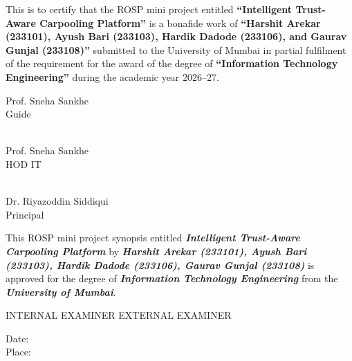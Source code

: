 \documentclass[12pt,a4paper,oneside]{report}
\newcommand{\frontheading}[1]{%
  \begin{center}\vspace*{0.2cm}{\Large\bfseries #1}\end{center}\vspace{0.8cm}}
\begin{document}
\clearpage
\frontheading{CERTIFICATE}
\justifying
This is to certify that the ROSP mini project entitled \textbf{``Intelligent
Trust-Aware Carpooling Platform''} is a bonafide work of \textbf{``Harshit Arekar
(233101), Ayush Bari (233103), Hardik Dadode (233106), and Gaurav Gunjal
(233108)''} submitted to the University of Mumbai in partial fulfilment of the
requirement for the award of the degree of \textbf{``Information Technology
Engineering''} during the academic year 2026--27.

\vspace{3cm}
\begin{center}
Prof. Sneha Sankhe\\Guide
\end{center}
\vspace{1.0cm}
\noindent
\begin{minipage}[t]{0.45\textwidth}\centering
\\
Prof. Sneha Sankhe\\HOD IT
\end{minipage}\hfill
\begin{minipage}[t]{0.45\textwidth}\centering
\\
Dr. Riyazoddin Siddiqui\\Principal
\end{minipage}
\vspace{1.2cm}

\clearpage
\frontheading{ROSP Mini Project Report Approval}
\justifying
This ROSP mini project synopsis entitled \textit{\textbf{Intelligent Trust-Aware
Carpooling Platform}} by \textit{\textbf{Harshit Arekar (233101), Ayush Bari (233103),
Hardik Dadode (233106), Gaurav Gunjal (233108)}} is approved for the degree
of \textit{\textbf{Information Technology Engineering}} from the \textit{\textbf{University of
Mumbai}}.

\vspace{8cm}
\noindent
INTERNAL EXAMINER\hfill
EXTERNAL EXAMINER

\vspace{1.6cm}
\noindent Date:\\[0.35em]
Place:
\vspace{1.0cm}
\end{document}
